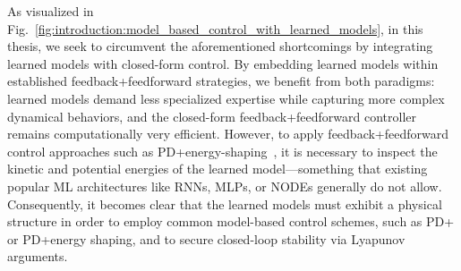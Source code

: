 As visualized in Fig.~\ref{fig:introduction:model_based_control_with_learned_models}, in this thesis, we seek to circumvent the aforementioned shortcomings by integrating learned models with closed-form control. By embedding learned models within established feedback+feedforward strategies, we benefit from both paradigms: learned models demand less specialized expertise while capturing more complex dynamical behaviors, and the closed-form feedback+feedforward controller remains computationally very efficient. However, to apply feedback+feedforward control approaches such as PD+energy-shaping~\citep{della2023model, caasenbrood2023control}, it is necessary to inspect the kinetic and potential energies of the learned model—something that existing popular \gls{ML} architectures like \glspl{RNN}, \glspl{MLP}, or \glspl{NODE} generally do not allow. Consequently, it becomes clear that the learned models must exhibit a physical structure in order to employ common model-based control schemes, such as PD+ or PD+energy shaping, and to secure closed-loop stability via Lyapunov arguments.

